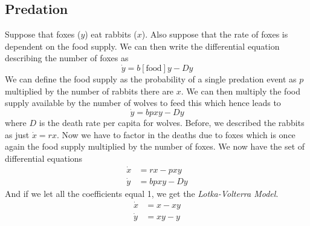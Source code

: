 \documentclass{article}
\begin{document}
\subsection{Predation}
Suppose that foxes ($y$) eat rabbits ($x$). Also suppose that the rate of foxes is dependent on the food supply. We can then write the differential equation describing the number of foxes as 
\begin{equation*}
    \dot y =b[\text{food}]y-Dy
\end{equation*}
We can define the food supply as the probability of a single predation event as $p$ multiplied by the number of rabbits there are $x$. We can then multiply the food supply available by the number of wolves to feed this which hence leads to 
\begin{equation*}
    \dot y=bpxy -Dy
\end{equation*}
where $D$ is the death rate per capita for wolves. Before, we described the rabbits as just $\dot x=rx$. Now we have to factor in the deaths due to foxes which is once again the food supply multiplied by the number of foxes. We now have the set of differential equations 
\begin{equation*}
    \begin{split}
        \dot x&=rx-pxy\\
        \dot y&=bpxy-Dy
    \end{split}
\end{equation*}
And if we let all the coefficients equal 1, we get the \emph{Lotka-Volterra Model}.
\begin{equation*}
    \begin{split}
        \dot x&=x-xy\\
        \dot y&=xy-y
    \end{split}
\end{equation*}
\end{document}
